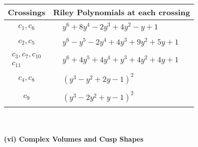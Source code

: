 \documentclass[1p]{elsarticle_modified}
\theoremstyle{definition}
\begin{document}
\begin{tabular}{m{50pt}|m{274pt}}
Crossings & \hspace{64pt}Riley Polynomials at each crossing \\
\hline $$\begin{aligned}c_{1},c_{6}\end{aligned}$$&$\begin{aligned}
&y^6+8 y^4-2 y^3+4 y^2- y+1
\end{aligned}$\\
\hline $$\begin{aligned}c_{2},c_{5}\end{aligned}$$&$\begin{aligned}
&y^6- y^5-2 y^4+4 y^3+9 y^2+5 y+1
\end{aligned}$\\
\hline $$\begin{aligned}c_{3},c_{7},c_{10}\\c_{11}\end{aligned}$$&$\begin{aligned}
&y^6+4 y^5+4 y^4+y^3+4 y^2+4 y+1
\end{aligned}$\\
\hline $$\begin{aligned}c_{4},c_{8}\end{aligned}$$&$\begin{aligned}
&(y^3- y^2+2 y-1)^2
\end{aligned}$\\
\hline $$\begin{aligned}c_{9}\end{aligned}$$&$\begin{aligned}
&(y^3-2 y^2+y-1)^2
\end{aligned}$\\
\hline
\end{tabular}\\~\\
\newpage\flushleft \textbf{(vi) Complex Volumes and Cusp Shapes}
\end{document}

